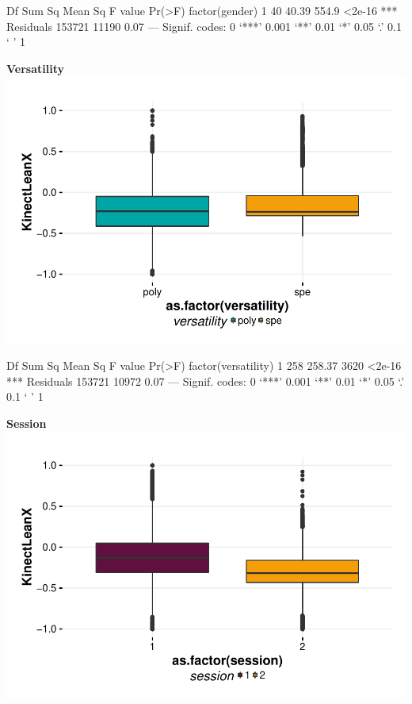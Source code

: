 \documentclass{article}
\begin{document}
\begin{Schunk}
\begin{Soutput}
                   Df Sum Sq Mean Sq F value Pr(>F)    
factor(gender)      1     40   40.39   554.9 <2e-16 ***
Residuals      153721  11190    0.07                   
---
Signif. codes:  0 ‘***’ 0.001 ‘**’ 0.01 ‘*’ 0.05 ‘.’ 0.1 ‘ ’ 1
\end{Soutput}
\end{Schunk}


\textbf{Versatility}
\includegraphics{features-plot_leanx_gender_quiz}

\begin{Schunk}
\begin{Soutput}
                        Df Sum Sq Mean Sq F value Pr(>F)    
factor(versatility)      1    258  258.37    3620 <2e-16 ***
Residuals           153721  10972    0.07                   
---
Signif. codes:  0 ‘***’ 0.001 ‘**’ 0.01 ‘*’ 0.05 ‘.’ 0.1 ‘ ’ 1
\end{Soutput}
\end{Schunk}


\textbf{Session}
\includegraphics{features-plot_leanx_session_quiz}
\end{document}

